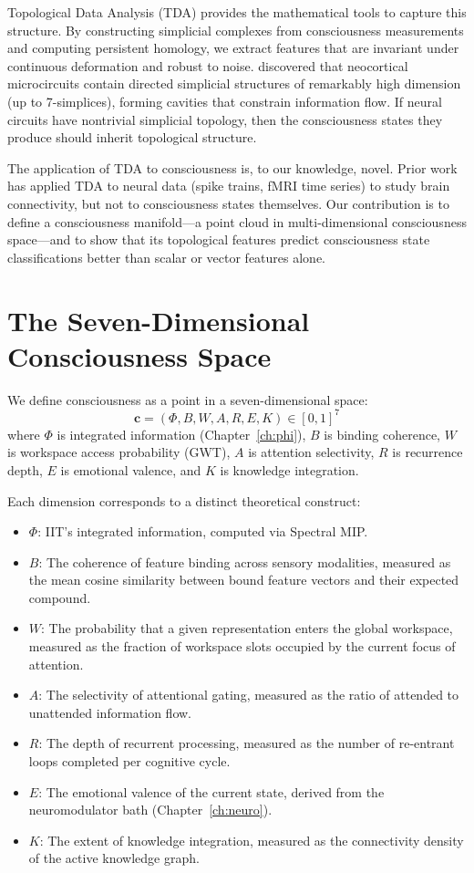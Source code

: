 \documentclass[12pt]{book}
\begin{document}
Topological Data Analysis (TDA) provides the mathematical tools to capture this structure. By constructing simplicial complexes from consciousness measurements and computing persistent homology, we extract features that are invariant under continuous deformation and robust to noise. \citet{reimann2017cliques} discovered that neocortical microcircuits contain directed simplicial structures of remarkably high dimension (up to 7-simplices), forming cavities that constrain information flow. If neural circuits have nontrivial simplicial topology, then the consciousness states they produce should inherit topological structure.

The application of TDA to consciousness is, to our knowledge, novel. Prior work has applied TDA to neural data (spike trains, fMRI time series) to study brain connectivity, but not to consciousness states themselves. Our contribution is to define a consciousness manifold---a point cloud in multi-dimensional consciousness space---and to show that its topological features predict consciousness state classifications better than scalar or vector features alone.

\section{The Seven-Dimensional Consciousness Space}

We define consciousness as a point in a seven-dimensional space:
\begin{equation}\label{eq:consciousness-space}
\mathbf{c} = (\Phi, B, W, A, R, E, K) \in [0,1]^7
\end{equation}
where $\Phi$ is integrated information (Chapter~\ref{ch:phi}), $B$ is binding coherence, $W$ is workspace access probability (GWT), $A$ is attention selectivity, $R$ is recurrence depth, $E$ is emotional valence, and $K$ is knowledge integration.

Each dimension corresponds to a distinct theoretical construct:
\begin{itemize}
  \item $\Phi$: IIT's integrated information, computed via Spectral MIP.
  \item $B$: The coherence of feature binding across sensory modalities, measured as the mean cosine similarity between bound feature vectors and their expected compound.
  \item $W$: The probability that a given representation enters the global workspace, measured as the fraction of workspace slots occupied by the current focus of attention.
  \item $A$: The selectivity of attentional gating, measured as the ratio of attended to unattended information flow.
  \item $R$: The depth of recurrent processing, measured as the number of re-entrant loops completed per cognitive cycle.
  \item $E$: The emotional valence of the current state, derived from the neuromodulator bath (Chapter~\ref{ch:neuro}).
  \item $K$: The extent of knowledge integration, measured as the connectivity density of the active knowledge graph.
\end{itemize}
\end{document}
